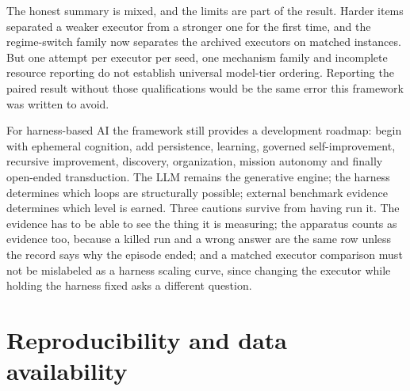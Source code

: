 \documentclass[11pt]{article}
\theoremstyle{definition}
\begin{document}
The honest summary is mixed, and the limits are part of the result. Harder items separated a weaker executor from a stronger one for the first time, and the regime-switch family now separates the archived executors on matched instances. But one attempt per executor per seed, one mechanism family and incomplete resource reporting do not establish universal model-tier ordering. Reporting the paired result without those qualifications would be the same error this framework was written to avoid.

For harness-based AI the framework still provides a development roadmap: begin with ephemeral cognition, add persistence, learning, governed self-improvement, recursive improvement, discovery, organization, mission autonomy and finally open-ended transduction. The LLM remains the generative engine; the harness determines which loops are structurally possible; external benchmark evidence determines which level is earned. Three cautions survive from having run it. The evidence has to be able to see the thing it is measuring; the apparatus counts as evidence too, because a killed run and a wrong answer are the same row unless the record says why the episode ended; and a matched executor comparison must not be mislabeled as a harness scaling curve, since changing the executor while holding the harness fixed asks a different question.

\section*{Reproducibility and data availability}
\end{document}
